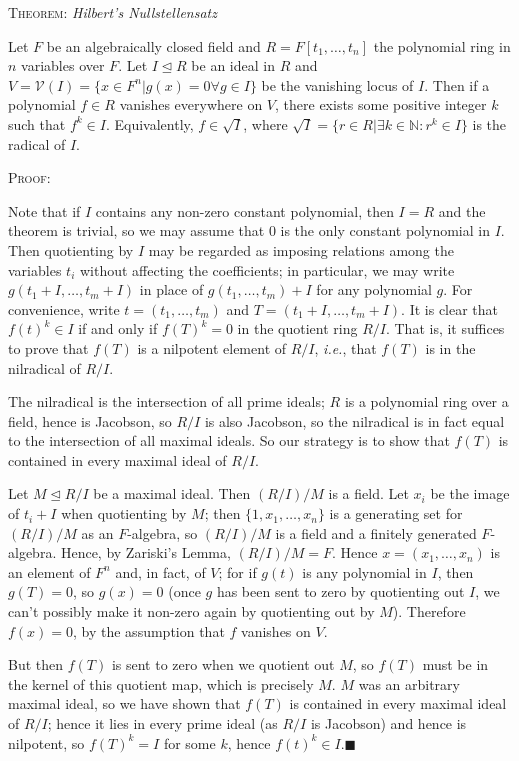 \documentclass[12pt,a4paper]{article}
\newcommand{\proof}{\noindent\textsc{\large Proof:}\par}
\newcommand{\thm}[1]{\noindent\textsc{\large Theorem:}  \textit{\large #1}\par}
\newcommand{\qed}{\hfill$\blacksquare$\gap}
\newcommand{\gap}{\par \vspace{5mm}}
\let\ideal\trianglelefteq
\begin{document}
\thm{Hilbert's Nullstellensatz}
Let $F$ be an algebraically closed field and $R=F[t_1,\hdots,t_n]$ the polynomial ring in $n$ variables over $F$. Let $I\ideal R$ be an ideal in $R$ and $V=\mathcal{V}(I)=\{x\in F^n | g(x)=0\forall g\in I\}$ be the vanishing locus of $I$. Then if a polynomial $f\in R$ vanishes everywhere on $V$, there exists some positive integer $k$ such that $f^k\in I$. Equivalently, $f\in \sqrt{I}$, where $\sqrt{I}=\{r\in R | \exists k\in \mathbb{N}: r^k\in I\}$ is the radical of $I$.\gap

\proof
Note that if $I$ contains any non-zero constant polynomial, then $I=R$ and the theorem is trivial, so we may assume that 0 is the only constant polynomial in $I$. Then quotienting by $I$ may be regarded as imposing relations among the variables $t_i$ without affecting the coefficients; in particular, we may write $g(t_1+I,\hdots,t_m+I)$ in place of $g(t_1,\hdots,t_m)+I$ for any polynomial $g$. For convenience, write $t=(t_1,\hdots,t_m)$ and $T=(t_1+I,\hdots,t_m+I)$. It is clear that $f(t)^k\in I$ if and only if $f(T)^k=0$ in the quotient ring $R/I$. That is, it suffices to prove that $f(T)$ is a nilpotent element of $R/I$, \textit{i.e.}, that $f(T)$ is in the nilradical of $R/I$.

The nilradical is the intersection of all prime ideals; $R$ is a polynomial ring over a field, hence is Jacobson, so $R/I$ is also Jacobson, so the nilradical is in fact equal to the intersection of all maximal ideals. So our strategy is to show that $f(T)$ is contained in every maximal ideal of $R/I$.

Let $M\ideal R/I$ be a maximal ideal. Then $(R/I)/M$ is a field. Let $x_i$ be the image of $t_i+I$ when quotienting by $M$; then $\{1,x_1,\hdots,x_n\}$ is a generating set for $(R/I)/M$ as an $F$-algebra, so $(R/I)/M$ is a field and a finitely generated $F$-algebra. Hence, by Zariski's Lemma, $(R/I)/M=F$. Hence $x=(x_1,\hdots,x_n)$ is an element of $F^n$ and, in fact, of $V$; for if $g(t)$ is any polynomial in $I$, then $g(T)=0$, so $g(x)=0$ (once $g$ has been sent to zero by quotienting out $I$, we can't possibly make it non-zero again by quotienting out by $M$). Therefore $f(x)=0$, by the assumption that $f$ vanishes on $V$.

But then $f(T)$ is sent to zero when we quotient out $M$, so $f(T)$ must be in the kernel of this quotient map, which is precisely $M$. $M$ was an arbitrary maximal ideal, so we have shown that $f(T)$ is contained in every maximal ideal of $R/I$; hence it lies in every prime ideal (as $R/I$ is Jacobson) and hence is nilpotent, so $f(T)^k=I$ for some $k$, hence $f(t)^k\in I$.\qed
\end{document}
